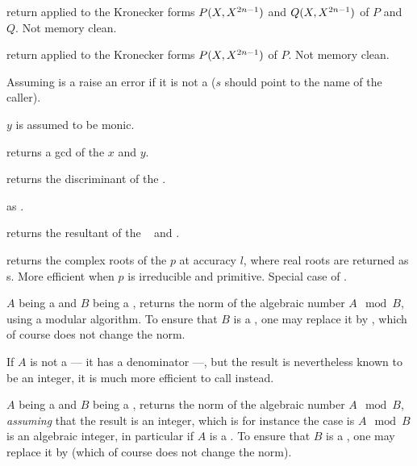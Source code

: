 return 
applied to the Kronecker forms $P(X,X^{2\*n-1})$ and $Q(X,X^{2\*n-1})$
of $P$ and $Q$. Not memory clean.

 return 
applied to the Kronecker forms $P(X,X^{2\*n-1})$
of $P$. Not memory clean.


 Assuming  is a 
raise an error if it is not a  ($s$ should point to the name of the
caller).



 $y$ is assumed to be monic.

 returns a gcd of the  $x$ and $y$.

 returns the discriminant of the 
.

 as .

 returns the resultant of the
~ and .

 returns the complex roots of the
 $p$ at accuracy $l$, where real roots are returned as s.
More efficient when $p$ is irreducible and primitive. Special case
of .


 $A$ being a  and $B$ being a
, returns the norm of the algebraic number $A \mod B$, using a
modular algorithm. To ensure that $B$ is a , one may replace it by
, which of course does not change the norm.

If $A$ is not a  --- it has a denominator ---, but the result is
nevertheless known to be an integer, it is much more efficient to call
 instead.

 $A$ being a  and $B$
being a , returns the norm of the algebraic number $A \mod B$,
\emph{assuming} that the result is an integer, which is for instance the case
is $A\mod B$ is an algebraic integer, in particular if $A$ is a . To
ensure that $B$ is a , one may replace it by 
(which of course does not change the norm).

